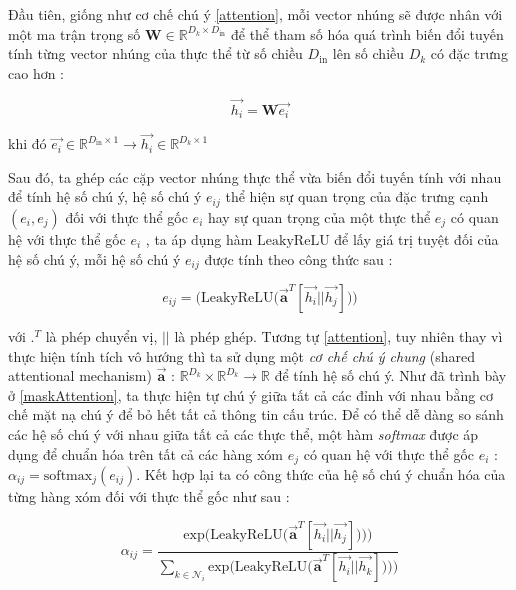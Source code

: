 Đầu tiên, giống như cơ chế chú ý \ref{attention}, mỗi vector nhúng sẽ được nhân với một ma trận trọng số $\mathbf{W} \in \mathbb{R}^{D_k \times D_{\text{in}}}$ để thể tham số hóa quá trình biến đổi tuyến tính từng vector nhúng của thực thể từ số chiều $D_{\text{in}}$ lên số chiều $D_k$ có đặc trưng cao hơn :

\begin{equation}
\overrightarrow{h_i} = \mathbf{W} \overrightarrow{e_i}
\end{equation}

khi đó $\overrightarrow{e_i} \in \mathbb{R}^{D_{\text{in}} \times 1}
\xrightarrow{} \overrightarrow{h_i} \in \mathbb{R}^{D_k \times 1}$

Sau đó, ta ghép các cặp vector nhúng thực thể vừa biến đổi tuyến tính với nhau để tính hệ số chú ý, hệ số chú ý $e_{ij}$ thể hiện sự quan trọng của đặc trưng cạnh $(e_i, e_j)$ đối với thực thể gốc $e_i$ hay sự quan trọng của một thực thể $e_j$ có quan hệ với thực thể gốc $e_i$ , ta áp dụng hàm $\text{LeakyReLU}$ để lấy giá trị tuyệt đối của hệ số chú ý, mỗi hệ số chú ý $e_{ij}$ được tính theo công thức sau :

\begin{equation}
e_{ij} = \Big( \text{LeakyReLU} \Big( \overrightarrow{\mathbf{a}}^{T} [\overrightarrow{h_i} || \overrightarrow{h_j}]\Big) \Big)
\end{equation}

với ${.}^{T}$ là phép chuyển vị, $||$ là phép ghép. Tương tự \ref{attention}, tuy nhiên thay vì thực hiện tính tích vô hướng thì ta sử dụng một \textit{cơ chế chú ý chung} (shared attentional mechanism) $\overrightarrow{\mathbf{a}}$ : $\mathbb{R}^{D_k} \times \mathbb{R}^{D_k} \xrightarrow{} \mathbb{R}$ để tính hệ số chú ý. Như đã trình bày ở \ref{maskAttention}, ta thực hiện tự chú ý giữa tất cả các đỉnh với nhau bằng cơ chế mặt nạ chú ý để bỏ hết tất cả thông tin cấu trúc.
Để có thể dễ dàng so sánh các hệ số chú ý với nhau giữa tất cả các thực thể, một hàm \textit{softmax} được áp dụng để chuẩn hóa trên tất cả các hàng xóm $e_j$ có quan hệ với thực thể gốc $e_i$ : $\alpha_{ij} = \text{softmax}_j(e_{ij})$. Kết hợp lại ta có công thức của hệ số chú ý chuẩn hóa của từng hàng xóm đối với thực thể gốc như sau :

\begin{equation}
\label{attentionCoeff}
\alpha_{ij} = \frac{
	\text{exp} \Big( \text{LeakyReLU} \Big( \overrightarrow{\mathbf{a}}^{T} [ \overrightarrow{h_i} || \overrightarrow{h_j}]\Big) \Big))
}
{
	\sum_{k \in \mathcal{N}_i}
	\text{exp} \Big( \text{LeakyReLU} \Big( \overrightarrow{\mathbf{a}}^{T} [\overrightarrow{h_i} || \overrightarrow{h_k}]\Big) \Big))
}
\end{equation}

